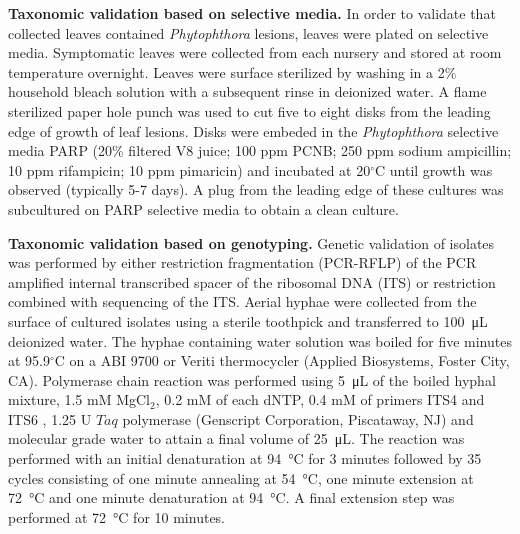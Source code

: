 \documentclass[12pt]{article}
\begin{document}
\textbf{Taxonomic validation based on selective media.} In order to validate that collected leaves contained \emph{Phytophthora} lesions, leaves were plated on selective media.  Symptomatic leaves were collected from each nursery and stored at room temperature overnight.  Leaves were surface sterilized by washing in a 2\% household bleach solution with a subsequent rinse in deionized water.  A flame sterilized paper hole punch was used to cut five to eight disks from the leading edge of growth of leaf lesions.  Disks were embeded in the \emph{Phytophthora} selective media PARP (20\% filtered V8 juice; 100 ppm PCNB; 250 ppm sodium ampicillin; 10 ppm rifampicin; 10 ppm pimaricin)\cite{jeffers_martin_1986} and incubated at 20$^\circ$C until growth was observed (typically 5-7 days).  A plug from the leading edge of these cultures was subcultured on PARP selective media to obtain a clean culture.

\textbf{Taxonomic validation based on genotyping.} Genetic validation of isolates was performed by either restriction fragmentation (PCR-RFLP) of the PCR amplified internal transcribed spacer of the ribosomal DNA (ITS) or restriction combined with sequencing of the ITS.  Aerial hyphae were collected from the surface of cultured isolates using a sterile toothpick and transferred to \SI{100}{\micro\liter} deionized water.  The hyphae containing water solution was boiled for five minutes at 95.9$^\circ$C on a ABI 9700 or Veriti thermocycler (Applied Biosystems, Foster City, CA).  Polymerase chain reaction was performed using \SI{5}{\micro\liter} of the boiled hyphal mixture, 1.5 mM MgCl$_{2}$, 0.2 mM of each dNTP, 0.4 mM of primers ITS4 and ITS6 \cite{grunwald_etal_2011, cooke_etal_2000},  1.25 U $Taq$ polymerase (Genscript Corporation, Piscataway, NJ) and molecular grade water to attain a final volume of \SI{25}{\micro\liter}.  The reaction was performed with an initial denaturation at \SI{94}{\celsius} for 3 minutes followed by 35 cycles consisting of one minute annealing at \SI{54}{\celsius}, one minute extension at \SI{72}{\celsius} and one minute denaturation at \SI{94}{\celsius}.  A final extension step was performed at \SI{72}{\celsius} for 10 minutes.

\end{document}
